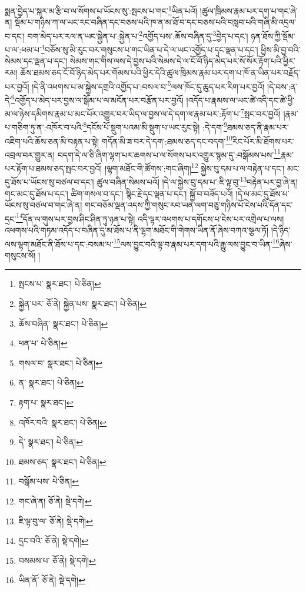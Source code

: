 སྨན་བྱེད་པ་སྐར་མ་རྩི་བ་ལ་སོགས་པ་ཡོངས་སུ་:སྤངས་པ་གང་\footnote{སྤངས་པ་  སྣར་ཐང་།  པེ་ཅིན། }ཡིན་པའོ། །ཚུལ་ཁྲིམས་རྣམ་པར་དག་པ་གང་ཞེ་ན། སྡོམ་པ་གཉིས་ཀ་ལ་ཡང་རང་བཞིན་དང་བཅས་པའི་ཁ་ན་མ་ཐོ་བ་དང་བཅས་པའི་བསླབ་པའི་གཞི་མི་འདྲལ་བ་དང་། བག་མེད་པར་རལ་ན་ཡང་སྐྱེན་པ་:སྐྱེན་པ་\footnote{སྐྱེན་པར་  ཅོ་ནེ། སྐྱེན་པས་  སྣར་ཐང་།  པེ་ཅིན། }འགྱོད་པས་:ཆོས་བཞིན་དུ་\footnote{ཆོས་བཞིན་  སྣར་ཐང་།  པེ་ཅིན། }བྱེད་པ་དང་། ཉན་ཐོས་ཀྱི་སྡོམ་པ་ལ་:ཕམ་པ་\footnote{ཕན་པ་  པེ་ཅིན། }བཅོས་སུ་མི་རུང་བར་གསུངས་པ་གང་ཡིན་པ་དེ་ལ་ཡང་འགྱོད་པ་དང་ལྡན་པ་དང་། ཕྱིས་མི་བྱ་བའི་སེམས་དང་ལྡན་པ་དང་། སེམས་གང་གིས་ལས་དེ་བྱས་པའི་སེམས་དེ་ལ་ངོ་བོ་ཉིད་མེད་པར་སོ་སོར་རྟོག་པའི་ཕྱིར་རམ། ཆོས་ཐམས་ཅད་ངོ་བོ་ཉིད་མེད་པར་གོམས་པའི་ཕྱིར་དེའི་ཚུལ་ཁྲིམས་རྣམ་པར་དག་པ་ཁོ་ན་ཡིན་པར་བརྗོད་པར་བྱའོ། །དེ་ནི་འཕགས་པ་མ་སྐྱེས་དགྲའི་འགྱོད་པ་:བསལ་བ་\footnote{གསལ་བ་  སྣར་ཐང་།  པེ་ཅིན། }ལས་ཁོང་དུ་ཆུད་པར་རིག་པར་བྱའོ། །དེ་བས་:ན་དེ་\footnote{ན་  སྣར་ཐང་།  པེ་ཅིན། }འགྱོད་པ་མེད་པར་བྱས་ལ་སྒོམ་པ་ལ་མངོན་པར་བརྩོན་པར་བྱའོ། །འདོད་པ་རྣམས་ལ་ཡང་ཚེ་འདི་དང་ཚེ་ཕྱི་མ་ལ་ཉེས་དམིགས་རྣམ་པ་མང་པོར་འགྱུར་བར་ཡིད་ལ་བྱས་ལ་དེ་དག་ལ་རྣམ་པར་:རྟོག་པ་\footnote{རྟག་པ་  སྣར་ཐང་། }སྤང་བར་བྱའོ། །རྣམ་པ་གཅིག་ཏུ་ན་:འཁོར་བ་པའི་\footnote{འཁོར་བའི་  སྣར་ཐང་།  པེ་ཅིན། }དངོས་པོ་སྡུག་པའམ་མི་སྡུག་པ་ཡང་རུང་སྟེ། :དེ་དག་\footnote{དེ་  སྣར་ཐང་།  པེ་ཅིན། }ཐམས་ཅད་ནི་རྣམ་པར་འཇིག་པའི་ཆོས་ཅན་མི་བརྟན་པ་སྟེ། གདོན་མི་ཟ་བར་དེ་དག་:ཐམས་ཅད་དང་བདག་\footnote{ཐམས་ཅད་  སྣར་ཐང་།  པེ་ཅིན། }རིང་པོར་མི་ཐོགས་པར་འབྲལ་བར་གྱུར་ན། བདག་དེ་ལ་ཅི་ཞིག་ལྷག་པར་ཆགས་པ་ལ་སོགས་པར་འགྱུར་སྙམ་དུ་:བསྒོམས་པས་\footnote{བསྒོམ་པས་  པེ་ཅིན། }རྣམ་པར་རྟོག་པ་ཐམས་ཅད་སྤང་བར་བྱའོ། །ལྷག་མཐོང་གི་ཚོགས་:གང་ཞིག།\footnote{གང་ཞེ་ན།  ཅོ་ནེ།  སྡེ་དགེ། } སྐྱེས་བུ་དམ་པ་ལ་བརྟེན་པ་དང་། མང་དུ་ཐོས་པ་ཡོངས་སུ་བཙལ་བ་དང་། ཚུལ་བཞིན་སེམས་པའོ། །དེ་ལ་སྐྱེས་བུ་དམ་པ་:ཇི་ལྟ་བུ་\footnote{ཇི་ལྟ་བུ་ལ་  ཅོ་ནེ།  སྡེ་དགེ། }བརྟེན་པར་བྱ་ཞེ་ན། གང་མང་དུ་ཐོས་པ་དང་། ཚིག་གསལ་བ་དང་། སྙིང་རྗེ་དང་ལྡན་པ་དང་། སྐྱོ་བ་བཟོད་པའོ། །དེ་ལ་མང་དུ་ཐོས་པ་ཡོངས་སུ་བཙལ་བ་གང་ཞེ་ན། གང་བཅོམ་ལྡན་འདས་ཀྱི་གསུང་རབ་ཡན་ལག་བཅུ་གཉིས་པོ་ངེས་པའི་དོན་དང་དྲང་\footnote{དྲང་བའི་  ཅོ་ནེ།  སྡེ་དགེ། }དོན་ལ་གུས་པར་བྱས་ཤིང་ཤིན་ཏུ་ཉན་པ་སྟེ། འདི་ལྟར་འཕགས་པ་དགོངས་པ་ངེས་པར་འགྲེལ་པ་ལས། འཕགས་པའི་གཏམ་འདོད་པ་བཞིན་དུ་མ་ཐོས་པ་ནི་ལྷག་མཐོང་གི་གེགས་ཡིན་ནོ་ཞེས་བཀའ་སྩལ་ཏོ། །དེ་ཉིད་ལས་ལྷག་མཐོང་ནི་ཐོས་པ་དང་:བསམ་པ་\footnote{བསམས་པ་  ཅོ་ནེ།  སྡེ་དགེ། }ལས་བྱུང་བའི་ལྟ་བ་རྣམ་པར་དག་པའི་རྒྱུ་ལས་བྱུང་བ་ཡིན་\footnote{ཡིན་ནོ་  ཅོ་ནེ།  སྡེ་དགེ། }ཞེས་གསུངས་སོ། །

